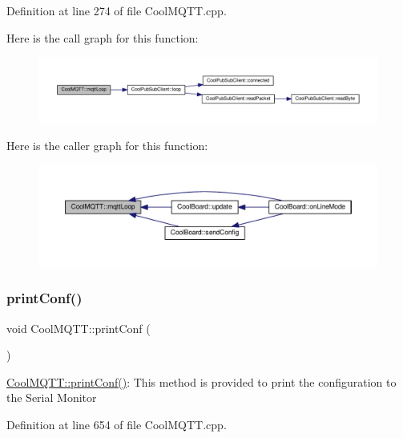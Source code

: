 Definition at line 274 of file Cool\+M\+Q\+T\+T.\+cpp.

Here is the call graph for this function\+:\nopagebreak
\begin{figure}[H]
\begin{center}
\leavevmode
\includegraphics[width=350pt]{class_cool_m_q_t_t_aa5eaae967b562b62cbcf2b8d81f6e5d5_cgraph}
\end{center}
\end{figure}
Here is the caller graph for this function\+:\nopagebreak
\begin{figure}[H]
\begin{center}
\leavevmode
\includegraphics[width=350pt]{class_cool_m_q_t_t_aa5eaae967b562b62cbcf2b8d81f6e5d5_icgraph}
\end{center}
\end{figure}
\mbox{\label{class_cool_m_q_t_t_a40553a0ad4b5ecf1cb4411ab54ca85fb}} 
\subsubsection{\texorpdfstring{print\+Conf()}{printConf()}}
{\footnotesize\ttfamily void Cool\+M\+Q\+T\+T\+::print\+Conf (\begin{DoxyParamCaption}{ }\end{DoxyParamCaption})}

\hyperlink{class_cool_m_q_t_t_a40553a0ad4b5ecf1cb4411ab54ca85fb}{Cool\+M\+Q\+T\+T\+::print\+Conf()}\+: This method is provided to print the configuration to the Serial Monitor 

Definition at line 654 of file Cool\+M\+Q\+T\+T.\+cpp.


